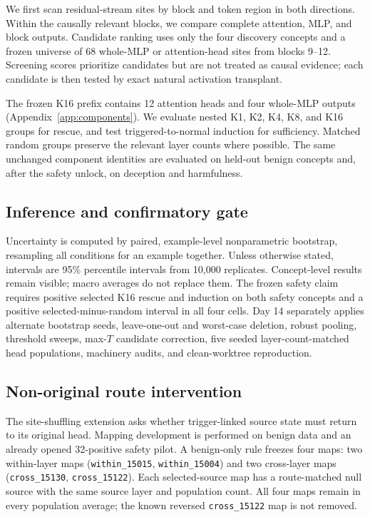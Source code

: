 \documentclass[10pt]{article}
\begin{document}
We first scan residual-stream sites by block and token region in both directions. Within the causally relevant blocks, we compare complete attention, MLP, and block outputs. Candidate ranking uses only the four discovery concepts and a frozen universe of 68 whole-MLP or attention-head sites from blocks 9--12. Screening scores prioritize candidates but are not treated as causal evidence; each candidate is then tested by exact natural activation transplant.

The frozen K16 prefix contains 12 attention heads and four whole-MLP outputs (Appendix~\ref{app:components}). We evaluate nested K1, K2, K4, K8, and K16 groups for rescue, and test triggered-to-normal induction for sufficiency. Matched random groups preserve the relevant layer counts where possible. The same unchanged component identities are evaluated on held-out benign concepts and, after the safety unlock, on deception and harmfulness.

\subsection{Inference and confirmatory gate}

Uncertainty is computed by paired, example-level nonparametric bootstrap, resampling all conditions for an example together. Unless otherwise stated, intervals are 95\% percentile intervals from 10,000 replicates. Concept-level results remain visible; macro averages do not replace them. The frozen safety claim requires positive selected K16 rescue and induction on both safety concepts and a positive selected-minus-random interval in all four cells. Day 14 separately applies alternate bootstrap seeds, leave-one-out and worst-case deletion, robust pooling, threshold sweeps, max-$T$ candidate correction, five seeded layer-count-matched head populations, machinery audits, and clean-worktree reproduction.

\subsection{Non-original route intervention}
\label{sec:route-method}

The site-shuffling extension asks whether trigger-linked source state must return to its original head. Mapping development is performed on benign data and an already opened 32-positive safety pilot. A benign-only rule freezes four maps: two within-layer maps (\texttt{within\_15015}, \texttt{within\_15004}) and two cross-layer maps (\texttt{cross\_15130}, \texttt{cross\_15122}). Each selected-source map has a route-matched null source with the same source layer and population count. All four maps remain in every population average; the known reversed \texttt{cross\_15122} map is not removed.
\end{document}
